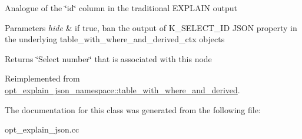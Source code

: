 Analogue of the \char`\"{}id\char`\"{} column in the traditional E\+X\+P\+L\+A\+IN output


\begin{DoxyParams}{Parameters}
{\em hide} & if true, ban the output of K\+\_\+\+S\+E\+L\+E\+C\+T\+\_\+\+ID J\+S\+ON property in the underlying table\+\_\+with\+\_\+where\+\_\+and\+\_\+derived\+\_\+ctx objects\\
\hline
\end{DoxyParams}
\begin{DoxyReturn}{Returns}
\char`\"{}\+Select number\char`\"{} that is associated with this node 
\end{DoxyReturn}


Reimplemented from \mbox{\hyperlink{classopt__explain__json__namespace_1_1table__with__where__and__derived_ab71bf926210b34494e172ff100cc348b}{opt\+\_\+explain\+\_\+json\+\_\+namespace\+::table\+\_\+with\+\_\+where\+\_\+and\+\_\+derived}}.



The documentation for this class was generated from the following file\+:\begin{DoxyCompactItemize}
\item 
opt\+\_\+explain\+\_\+json.\+cc\end{DoxyCompactItemize}
